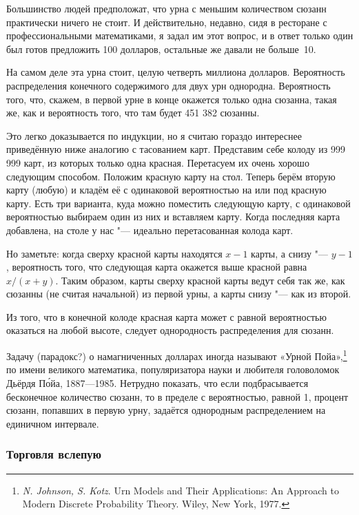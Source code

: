 \documentclass[twoside]{book}
\begin{document}
Большинство людей предположат, что урна с меньшим количеством сюзанн практически ничего не стоит.
И действительно, недавно, сидя в ресторане с профессиональными математиками, я задал им этот вопрос, и в ответ только один был готов предложить 100 долларов, остальные же давали не больше~10.

На самом деле эта урна стоит,  целую четверть миллиона долларов.
Вероятность распределения конечного содержимого для двух урн однородна.
Вероятность того, что, скажем, в первой урне в конце окажется только одна сюзанна, такая же, как и вероятность того, что там будет 451 382 сюзанны.

Это легко доказывается по индукции, но я считаю гораздо интереснее приведённую ниже аналогию с тасованием карт.
Представим себе колоду из 
999 999 
карт, из которых только одна красная.
Перетасуем их очень хорошо следующим способом.
Положим красную карту на стол.
Теперь берём вторую карту (любую) и кладём её с одинаковой вероятностью на или под красную карту.
Есть три варианта, куда можно поместить следующую карту, с одинаковой вероятностью выбираем один из них и вставляем карту.
Когда последняя карта добавлена, на столе у нас "--- идеально перетасованная колода карт.

Но заметьте: когда сверху красной карты находятся $x-1$ карты, а снизу "--- $y-1$, вероятность того, что следующая карта окажется выше красной равна $x/(x+y)$.
Таким образом, карты сверху красной карты ведут себя так же, как сюзанны (не считая начальной) из первой урны, а карты снизу "--- как из второй.

Из того, что в конечной колоде красная карта может с равной вероятностью оказаться на любой высоте, следует однородность распределения для сюзанн.\heart
 
Задачу (парадокс?) о намагниченных долларах иногда называют «Урной Пойа»,\footnote{\emph{N. Johnson, S. Kotz}. {Urn Models and Their Applications: An Approach to Modern Discrete Probability Theory.} Wiley, New York, 1977.} по имени великого математика, популяризатора науки и любителя головоломок Дьёрдя П\'{о}йа, 1887---1985.
Нетрудно показать, что если подбрасывается бесконечное количество сюзанн, то в пределе с вероятностью, равной 1, процент сюзанн, попавших в первую урну, задаётся однородным распределением на единичном интервале.

\subsubsection*{Торговля вслепую}%
\end{document}
